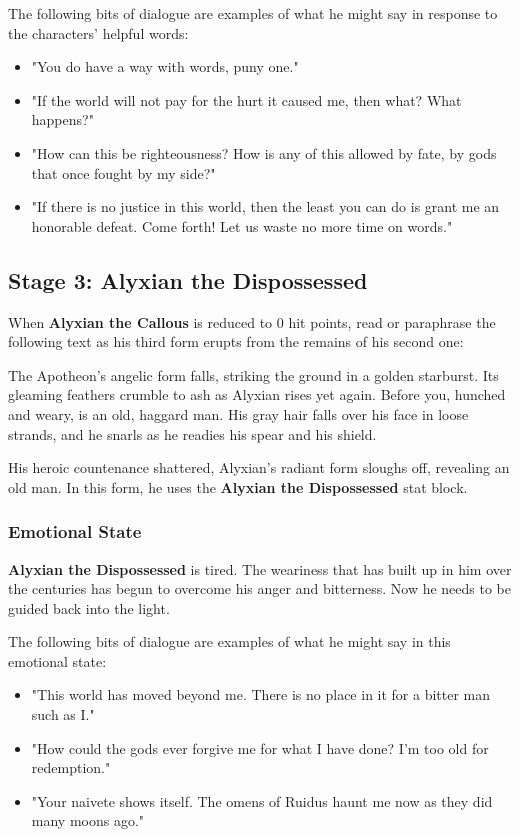 \documentclass[10pt,a4paper,twoside,fancy,bg=print,twocolumn,openany,nodeprecatedcode]{dndbook}
\begin{document}
The following bits of dialogue are examples of what he might say in response to the characters' helpful words:


\begin{itemize}
\item "You do have a way with words, puny one."
\item "If the world will not pay for the hurt it caused me, then what? What happens?"
\item "How can this be righteousness? How is any of this allowed by fate, by gods that once fought by my side?"
\item "If there is no justice in this world, then the least you can do is grant me an honorable defeat. Come forth! Let us waste no more time on words."
\end{itemize}

\subsection{Stage 3: Alyxian the Dispossessed}
When \textbf{Alyxian the Callous} is reduced to 0 hit points, read or paraphrase the following text as his third form erupts from the remains of his second one:

\begin{DndReadAloud}{}
The Apotheon's angelic form falls, striking the ground in a golden starburst. Its gleaming feathers crumble to ash as Alyxian rises yet again. Before you, hunched and weary, is an old, haggard man. His gray hair falls over his face in loose strands, and he snarls as he readies his spear and his shield.

\end{DndReadAloud}

His heroic countenance shattered, Alyxian's radiant form sloughs off, revealing an old man. In this form, he uses the \textbf{Alyxian the Dispossessed} stat block.

\subsubsection{Emotional State}
\textbf{Alyxian the Dispossessed} is tired. The weariness that has built up in him over the centuries has begun to overcome his anger and bitterness. Now he needs to be guided back into the light.

The following bits of dialogue are examples of what he might say in this emotional state:


\begin{itemize}
\item "This world has moved beyond me. There is no place in it for a bitter man such as I."
\item "How could the gods ever forgive me for what I have done? I'm too old for redemption."
\item "Your naivete shows itself. The omens of Ruidus haunt me now as they did many moons ago."
\end{itemize}
\end{document}
